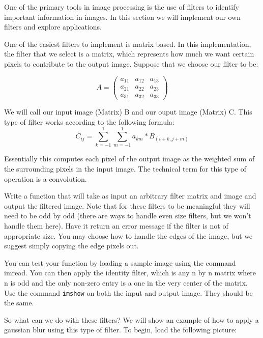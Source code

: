 

One of the primary tools in image processing is the use of filters to identify important information in images. In this section we will implement our own filters and explore applications.

One of the easiest filters to implement is matrix based. In this implementation, the filter that we select is a matrix, which represents how much we want certain pixels to contribute to the output image. Suppose that we choose our filter to be:

\[
A = \begin{pmatrix}
a_{11}&a_{12}&a_{13}\\
a_{21}&a_{22}&a_{23}\\
a_{31}&a_{32}&a_{33}
\end{pmatrix}
\]

We will call our input image (Matrix) B and our ouput image (Matrix) C. This type of filter works according to the following formula:
\[
C_{ij} = \sum_{k=-1}^1 \sum_{m=-1}^1 a_{km}*B_{(i+k,j+m)}
\]

Essentially this computes each pixel of the output image as the weighted sum of the surrounding pixels in the input image. The technical term for this type of operation is a convolution.

\begin{problem}
Write a function that will take as input an arbitrary filter matrix and image and output the filtered image. Note that for these filters to be meaningful they will need to be odd by odd (there are ways to handle even size filters, but we won't handle them here). Have it return an error message if the filter is not of appropriate size. You may choose how to handle the edges of the image, but we suggest simply copying the edge pixels out.

You can test your function by loading a sample image using the command imread. You can then apply the identity filter, which is any n by n matrix where n is odd and the only non-zero entry is a one in the very center of the matrix. Use the command {\tt imshow} on both the input and output image. They should be the same.
\end{problem}

So what can we do with these filters? We will show an example of how to apply a gaussian blur using this type of filter. To begin, load the following picture:

